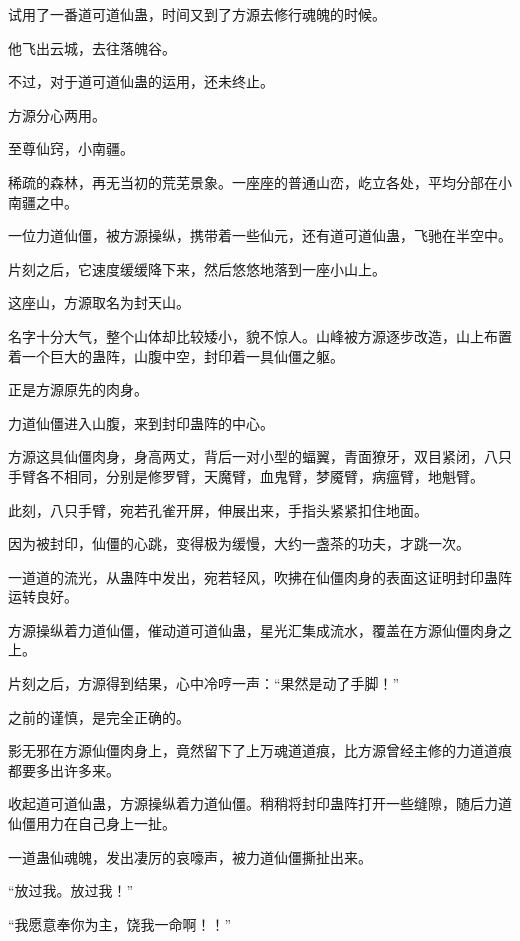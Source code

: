 
\begin{this_body}

试用了一番道可道仙蛊，时间又到了方源去修行魂魄的时候。

他飞出云城，去往落魄谷。

不过，对于道可道仙蛊的运用，还未终止。

方源分心两用。

至尊仙窍，小南疆。

稀疏的森林，再无当初的荒芜景象。一座座的普通山峦，屹立各处，平均分部在小南疆之中。

一位力道仙僵，被方源操纵，携带着一些仙元，还有道可道仙蛊，飞驰在半空中。

片刻之后，它速度缓缓降下来，然后悠悠地落到一座小山上。

这座山，方源取名为封天山。

名字十分大气，整个山体却比较矮小，貌不惊人。山峰被方源逐步改造，山上布置着一个巨大的蛊阵，山腹中空，封印着一具仙僵之躯。

正是方源原先的肉身。

力道仙僵进入山腹，来到封印蛊阵的中心。

方源这具仙僵肉身，身高两丈，背后一对小型的蝠翼，青面獠牙，双目紧闭，八只手臂各不相同，分别是修罗臂，天魔臂，血鬼臂，梦魇臂，病瘟臂，地魁臂。

此刻，八只手臂，宛若孔雀开屏，伸展出来，手指头紧紧扣住地面。

因为被封印，仙僵的心跳，变得极为缓慢，大约一盏茶的功夫，才跳一次。

一道道的流光，从蛊阵中发出，宛若轻风，吹拂在仙僵肉身的表面这证明封印蛊阵运转良好。

方源操纵着力道仙僵，催动道可道仙蛊，星光汇集成流水，覆盖在方源仙僵肉身之上。

片刻之后，方源得到结果，心中冷哼一声：“果然是动了手脚！”

之前的谨慎，是完全正确的。

影无邪在方源仙僵肉身上，竟然留下了上万魂道道痕，比方源曾经主修的力道道痕都要多出许多来。

收起道可道仙蛊，方源操纵着力道仙僵。稍稍将封印蛊阵打开一些缝隙，随后力道仙僵用力在自己身上一扯。

一道蛊仙魂魄，发出凄厉的哀嚎声，被力道仙僵撕扯出来。

“放过我。放过我！”

“我愿意奉你为主，饶我一命啊！！”


\end{this_body}
